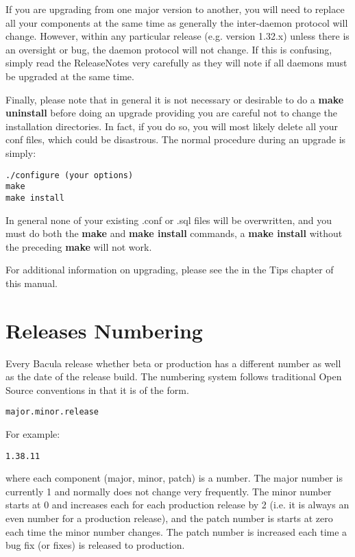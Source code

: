 If you are upgrading from one major version to another, you will need to
replace all your components at the same time as generally the inter-daemon
protocol will change. However, within any particular release (e.g. version
1.32.x) unless there is an oversight or bug, the daemon protocol will not
change. If this is confusing, simply read the ReleaseNotes very carefully as
they will note if all daemons must be upgraded at the same time. 

Finally, please note that in general it is not necessary or desirable
to do a {\bf make uninstall} before doing an upgrade providing you are careful
not to change the installation directories. In fact, if you do so, you will 
most likely delete all your conf files, which could be disastrous.
The normal procedure during an upgrade is simply:

\begin{verbatim}
./configure (your options)
make
make install
\end{verbatim}

In general none of your existing .conf or .sql files will be overwritten,
and you must do both the {\bf make} and {\bf make install}  commands, a
{\bf make install} without the preceding {\bf make} will not work.
  
For additional information on upgrading, please see the  in the Tips chapter of this manual.

\section{Releases Numbering}
Every Bacula release whether beta or production has a different number  
as well as the date of the release build. The numbering system follows
traditional Open Source conventions in that it is of the form.

\begin{verbatim}
major.minor.release
\end{verbatim}

For example:
\begin{verbatim}
1.38.11
\end{verbatim}

where each component (major, minor, patch) is a number.
The major number is currently 1 and normally does not change
very frequently.  The minor number starts at 0 and increases
each for each production release by 2 (i.e. it is always an
even number for a production release), and the patch number is
starts at zero each time the minor number changes.  The patch
number is increased each time a bug fix (or fixes) is released
to production.

